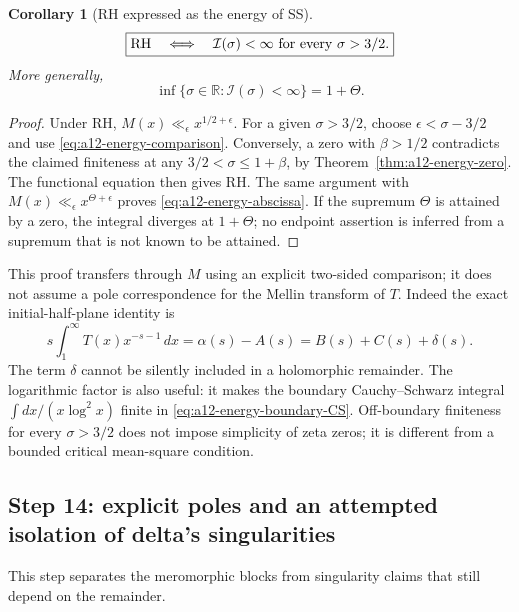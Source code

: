 \documentclass[11pt]{amsart}
\numberwithin{equation}{section}
\theoremstyle{plain}
\newtheorem{corollary}[theorem]{Corollary}
\theoremstyle{definition}
\theoremstyle{remark}
\begin{document}
\begin{corollary}[RH expressed as the energy of SS]
\label{cor:a12-energy-RH}
\begin{equation}
\label{eq:a12-energy-RH}
\boxed{\mathrm{RH}\quad\Longleftrightarrow\quad
\mathcal I(\sigma)<\infty\ \hbox{for every }\sigma>3/2.}
\end{equation}
More generally,
\begin{equation}
\label{eq:a12-energy-abscissa}
\inf\{\sigma\in\mathbb R:\mathcal I(\sigma)<\infty\}=1+\Theta.
\end{equation}
\end{corollary}
\begin{proof}
Under RH, $M(x)\ll_\epsilon x^{1/2+\epsilon}$. For a given $\sigma>3/2$,
choose $\epsilon<\sigma-3/2$ and use
\eqref{eq:a12-energy-comparison}. Conversely, a zero with $\beta>1/2$
contradicts the claimed finiteness at any
$3/2<\sigma\le1+\beta$, by Theorem~\ref{thm:a12-energy-zero}.
The functional equation then gives RH. The same argument with
$M(x)\ll_\epsilon x^{\Theta+\epsilon}$ proves
\eqref{eq:a12-energy-abscissa}. If the supremum $\Theta$ is attained by a
zero, the integral diverges at $1+\Theta$; no endpoint assertion is
inferred from a supremum that is not known to be attained.
\end{proof}

This proof transfers through $M$ using an explicit two-sided comparison;
it does not assume a pole correspondence for the Mellin transform of $T$.
Indeed the exact initial-half-plane identity is
\begin{equation}
\label{eq:a12-T-Mellin}
s\int_1^\infty T(x)x^{-s-1}\,dx
=\alpha(s)-A(s)=B(s)+C(s)+\delta(s).
\end{equation}
The term $\delta$ cannot be silently included in a holomorphic remainder.
The logarithmic factor is also useful:
it makes the boundary Cauchy--Schwarz integral
$\int dx/(x\log^2x)$ finite in
\eqref{eq:a12-energy-boundary-CS}.
Off-boundary finiteness for every $\sigma>3/2$ does not impose simplicity
of zeta zeros; it is different from a bounded critical mean-square
condition.

\subsection{Step 14: explicit poles and an attempted isolation of delta's singularities}
\label{subsec:a12-pole-attempt}
This step separates the meromorphic blocks from singularity claims that
still depend on the remainder.
\end{document}
